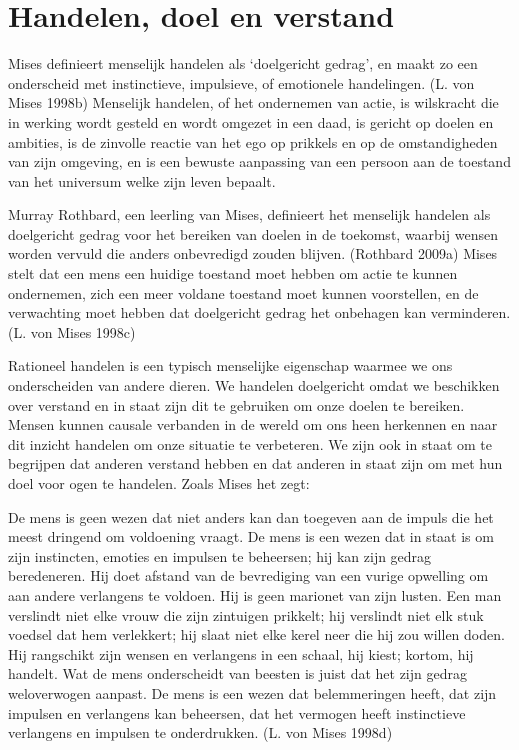 \documentclass[
  a5paper,
  smalldemyvopaper,11pt,twoside,onecolumn,openright,extrafontsizes,
hidelinks]{memoir}
\begin{document}
\section{Handelen, doel en verstand}\label{handelen-doel-en-verstand}

Mises definieert menselijk handelen als `doelgericht gedrag', en maakt
zo een onderscheid met instinctieve, impulsieve, of emotionele
handelingen. (L. von Mises 1998b) Menselijk handelen, of het ondernemen
van actie, is wilskracht die in werking wordt gesteld en wordt omgezet
in een daad, is gericht op doelen en ambities, is de zinvolle reactie
van het ego op prikkels en op de omstandigheden van zijn omgeving, en is
een bewuste aanpassing van een persoon aan de toestand van het universum
welke zijn leven bepaalt.

Murray Rothbard, een leerling van Mises, definieert het menselijk
handelen als doelgericht gedrag voor het bereiken van doelen in de
toekomst, waarbij wensen worden vervuld die anders onbevredigd zouden
blijven. (Rothbard 2009a) Mises stelt dat een mens een huidige toestand
moet hebben om actie te kunnen ondernemen, zich een meer voldane
toestand moet kunnen voorstellen, en de verwachting moet hebben dat
doelgericht gedrag het onbehagen kan verminderen. (L. von Mises 1998c)

Rationeel handelen is een typisch menselijke eigenschap waarmee we ons
onderscheiden van andere dieren. We handelen doelgericht omdat we
beschikken over verstand en in staat zijn dit te gebruiken om onze
doelen te bereiken. Mensen kunnen causale verbanden in de wereld om ons
heen herkennen en naar dit inzicht handelen om onze situatie te
verbeteren. We zijn ook in staat om te begrijpen dat anderen verstand
hebben en dat anderen in staat zijn om met hun doel voor ogen te
handelen. Zoals Mises het zegt:

De mens is geen wezen dat niet anders kan dan toegeven aan de impuls die
het meest dringend om voldoening vraagt. De mens is een wezen dat in
staat is om zijn instincten, emoties en impulsen te beheersen; hij kan
zijn gedrag beredeneren. Hij doet afstand van de bevrediging van een
vurige opwelling om aan andere verlangens te voldoen. Hij is geen
marionet van zijn lusten. Een man verslindt niet elke vrouw die zijn
zintuigen prikkelt; hij verslindt niet elk stuk voedsel dat hem
verlekkert; hij slaat niet elke kerel neer die hij zou willen doden. Hij
rangschikt zijn wensen en verlangens in een schaal, hij kiest; kortom,
hij handelt. Wat de mens onderscheidt van beesten is juist dat het zijn
gedrag weloverwogen aanpast. De mens is een wezen dat belemmeringen
heeft, dat zijn impulsen en verlangens kan beheersen, dat het vermogen
heeft instinctieve verlangens en impulsen te onderdrukken. (L. von Mises
1998d)
\end{document}

